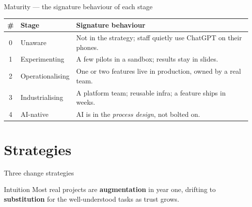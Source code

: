 \documentclass[aspectratio=169,11pt]{beamer}
\begin{document}
\begin{frame}{Maturity --- the signature behaviour of each stage}
  \small
  \begin{center}
  \begin{tabular}{clp{6.6cm}}
    \toprule
    \textbf{\#} & \textbf{Stage} & \textbf{Signature behaviour} \\
    \midrule
    0 & Unaware          & Not in the strategy; staff quietly use ChatGPT on their phones. \\
    1 & Experimenting    & A few pilots in a sandbox; results stay in slides. \\
    2 & Operationalising & One or two features live in production, owned by a real team. \\
    3 & Industrialising  & A platform team; reusable infra; a feature ships in weeks. \\
    4 & AI-native        & AI is in the \emph{process design}, not bolted on. \\
    \bottomrule
  \end{tabular}
  \end{center}
\end{frame}

\section{Strategies}
\begin{frame}{Three change strategies}
  \begin{center}
  \end{center}
  \begin{exampleblock}{Intuition}
    Most real projects are \textbf{augmentation} in year one, drifting to \textbf{substitution} for the well-understood tasks as trust grows.
  \end{exampleblock}
\end{frame}
\end{document}
